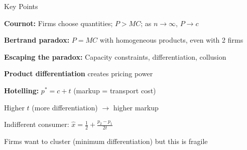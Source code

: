 \documentclass[notes,11pt, aspectratio=169]{beamer}
\newenvironment{wideenumerate}{\enumerate\addtolength{\itemsep}{10pt}}{\endenumerate}
\begin{document}
\begin{frame}{Key Points}
	\vspace{11pt}
	\begin{wideenumerate}
		\item \textbf{Cournot:} Firms choose quantities; $P > MC$; as $n \to \infty$, $P \to c$
		\item \textbf{Bertrand paradox:} $P = MC$ with homogeneous products, even with 2 firms
		\item \textbf{Escaping the paradox:} Capacity constraints, differentiation, collusion
		\item \textbf{Product differentiation} creates pricing power
		\item \textbf{Hotelling:} $p^* = c + t$ (markup = transport cost)
		\item Higher $t$ (more differentiation) $\rightarrow$ higher markup
		\item Indifferent consumer: $\hat{x} = \frac{1}{2} + \frac{p_2 - p_1}{2t}$
		\item Firms want to cluster (minimum differentiation) but this is fragile
	\end{wideenumerate}
\end{frame}
\end{document}
